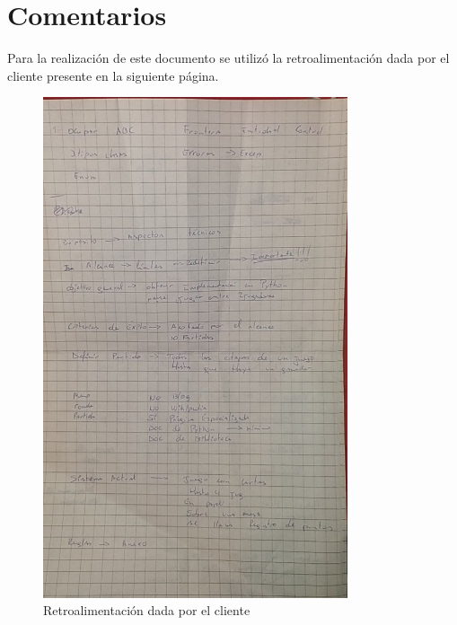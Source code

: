\section{Comentarios}\label{cap:ending}
Para la realización de este documento se utilizó la retroalimentación dada por el cliente presente en la siguiente página.
\begin{figure}[H]
    \centering
    \includegraphics[width=0.8\textwidth]{imagenes/retroalimentacion1.jpg}
    \caption{Retroalimentación dada por el cliente}
    \label{fig:retroalimentacion1}
\end{figure}

